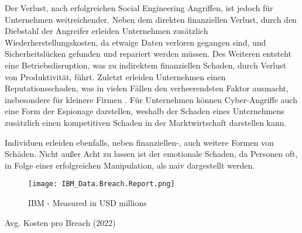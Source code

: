 Der Verlust, nach erfolgreichen Social Engineering Angriffen, ist jedoch für Unternehmen weitreichender.
Neben dem direkten finanziellen Verlust, durch den Diebstahl der Angreifer erleiden Unternehmen zusätzlich
Wiederherstellungskosten, da etwaige Daten verloren gegangen sind, und Sicherheitslücken gefunden und repariert
werden müssen. Des Weiteren entsteht eine Betriebsdisruption, was zu indirektem finanziellen Schaden, durch
Verlust von Produktivität, führt. Zuletzt erleiden Unternehmen einen Reputationsschaden, was in vielen Fällen
den verheerendsten Faktor ausmacht, insbesondere für kleinere Firmen .
Für Unternehmen können Cyber-Angriffe auch eine Form der Espionage darstellen, weshalb der Schaden eines
Unternehmens zusätzlich einen kompetitiven Schaden in der Marktwirtschaft darstellen kann. %

Individuen erleiden ebenfalls, neben finanziellen-, auch weitere Formen von Schäden.
Nicht außer Acht zu lassen ist der emotionale Schaden, da Personen oft, in Folge einer erfolgreichen
Manipulation, als naiv dargestellt werden. %






\begin{figure}[H]
    \centering
    \texttt{[image: IBM\_Data.Breach.Report.png]}
    \caption{IBM - Measured in USD millions}
\end{figure}
Avg. Kosten pro Breach (2022)




